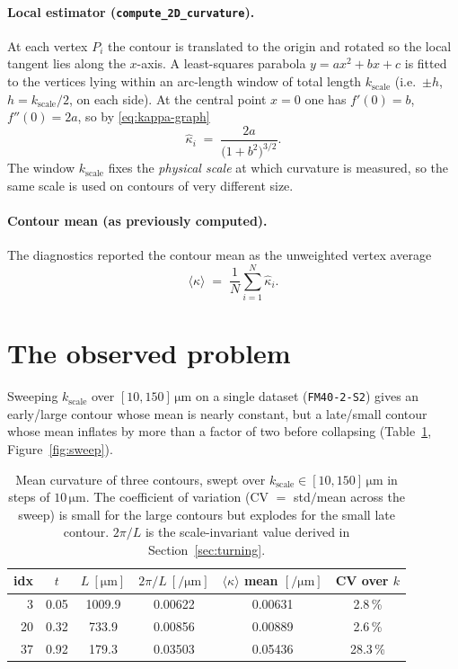 \documentclass[11pt]{article}
\newcommand{\um}{\si{\micro\meter}}
\newcommand{\uminv}{\si{\per\micro\meter}}
\newcommand{\code}[1]{\texttt{#1}}
\begin{document}
\paragraph{Local estimator (\code{compute\_2D\_curvature}).}
At each vertex $P_i$ the contour is translated to the origin and rotated so the
local tangent lies along the $x$-axis. A least-squares parabola
$y = a x^2 + b x + c$ is fitted to the vertices lying within an arc-length window
of total length $k_{\text{scale}}$ (i.e.\ $\pm h$, $h = k_{\text{scale}}/2$, on
each side). At the central point $x=0$ one has $f'(0)=b$, $f''(0)=2a$, so by
\eqref{eq:kappa-graph}
\begin{equation}
  \widehat{\kappa}_i \;=\; \frac{2a}{\bigl(1+b^2\bigr)^{3/2}}.
  \label{eq:kappa-est}
\end{equation}
The window $k_{\text{scale}}$ fixes the \emph{physical scale} at which curvature
is measured, so the same scale is used on contours of very different size.

\paragraph{Contour mean (as previously computed).}
The diagnostics reported the contour mean as the unweighted vertex average
\begin{equation}
  \langle\kappa\rangle \;=\; \frac{1}{N}\sum_{i=1}^{N}\widehat{\kappa}_i .
  \label{eq:mean-old}
\end{equation}

\section{The observed problem}
\label{sec:problem}

Sweeping $k_{\text{scale}}$ over $[10,150]\,\um$ on a single dataset
(\code{FM40-2-S2}) gives an early/large contour whose mean is nearly constant,
but a late/small contour whose mean inflates by more than a factor of two before
collapsing (Table~\ref{tab:summary}, Figure~\ref{fig:sweep}).

\begin{table}[h]
  \centering
  \begin{tabular}{rccccc}
    \toprule
    idx & $t$ & $L\ [\um]$ & $2\pi/L\ [\uminv]$ & $\langle\kappa\rangle$ mean $[\uminv]$ & CV over $k$ \\
    \midrule
     3 & 0.05 & 1009.9 & 0.00622 & 0.00631 & \phantom{0}2.8\,\% \\
    20 & 0.32 & \phantom{0}733.9 & 0.00856 & 0.00889 & \phantom{0}2.6\,\% \\
    37 & 0.92 & \phantom{0}179.3 & 0.03503 & 0.05436 & 28.3\,\% \\
    \bottomrule
  \end{tabular}
  \caption{Mean curvature of three contours, swept over
    $k_{\text{scale}}\in[10,150]\,\um$ in steps of $10\,\um$. The coefficient of
    variation (CV $=$ std$/$mean across the sweep) is small for the large
    contours but explodes for the small late contour. $2\pi/L$ is the
    scale-invariant value derived in Section~\ref{sec:turning}.}
  \label{tab:summary}
\end{table}
\end{document}
